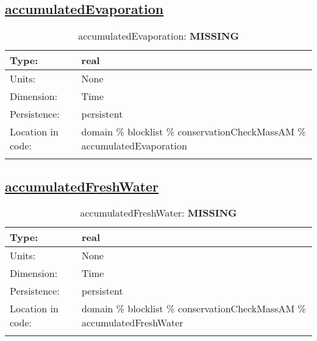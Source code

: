 \subsection[accumulatedEvaporation]{\hyperref[sec:var_tab_conservationCheckMassAM]{accumulatedEvaporation}}
\label{subsec:var_sec_conservationCheckMassAM_accumulatedEvaporation}
\begin{center}
\begin{longtable}{| p{2.0in} | p{4.0in} |}
        \hline 
        Type: & real \\
        \hline 
        Units: & \si{None} \\
        \hline 
        Dimension: & Time \\
        \hline 
        Persistence: & persistent \\
        \hline 
         Location in code: & domain \% blocklist \% conservationCheckMassAM \% accumulatedEvaporation \\
         \hline 
    \caption{accumulatedEvaporation: {\bf \color{red} MISSING}}
\end{longtable}
\end{center}
\subsection[accumulatedFreshWater]{\hyperref[sec:var_tab_conservationCheckMassAM]{accumulatedFreshWater}}
\label{subsec:var_sec_conservationCheckMassAM_accumulatedFreshWater}
\begin{center}
\begin{longtable}{| p{2.0in} | p{4.0in} |}
        \hline 
        Type: & real \\
        \hline 
        Units: & \si{None} \\
        \hline 
        Dimension: & Time \\
        \hline 
        Persistence: & persistent \\
        \hline 
         Location in code: & domain \% blocklist \% conservationCheckMassAM \% accumulatedFreshWater \\
         \hline 
    \caption{accumulatedFreshWater: {\bf \color{red} MISSING}}
\end{longtable}
\end{center}
